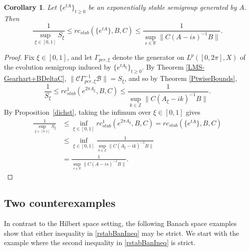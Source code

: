 \documentclass[10pt,psamsfonts,leqno]{siamltex}
\newtheorem{cor}[prop]{Corollary}
\newcommand{\bbR}{\mathbb{R}}
\newcommand{\bbZ}{\mathbb{Z}}
\newcommand{\calB}{\mathcal{B}}
\newcommand{\calC}{\mathcal{C}}
\newcommand{\lb}{\label}
\newcommand{\rcstab}{rc_{stab}}
\newcommand{\Gammaperxi}{\Gamma_{per,\xi}}
\begin{document}
\begin{cor}\lb{rstabBoundsCor}
Let $\{e^{tA}\}_{t\ge0}$ be an exponentially stable semigroup generated
by $A$.  Then
\[
\frac{1}{\sup_{\xi\in[0,1]}S_\xi}\le
\rcstab(\{e^{tA}\},B,C)
\le \frac{1}{\sup_{s\in\bbR}\|C(A-is)^{-1}B\|}.
\]
\end{cor}

\begin{proof}  Fix $\xi\in[0,1]$, and let $\Gammaperxi$ denote
the generator on $L^p([0,2\pi],X)$ of the evolution semigroup  induced
by
$\{e^{tA_\xi}\}_{t\ge0}$.  By Theorem \ref{LMS-Gearhart+BDeltaC},
$\|\calC\Gammaperxi^{-1}\calB\|=S_\xi$,
and so by Theorem \ref{PtwiseBounds},
\[
\frac{1}{S_\xi}\le
\rcstab^1(e^{2\pi A_\xi},B,C)
\le \frac{1}{\sup_{k\in\bbZ}\|C(A_\xi-ik)^{-1}B\|}.
\]
By Proposition~\ref{dichst}, taking the infimum over $\xi\in[0,1]$ gives
\begin{align*}
\frac{1}{\sup_{\xi\in[0,1]}S_\xi}&
\le \inf_{\xi\in[0,1]}\rcstab^1(e^{2\pi A_\xi},B,C)
=\rcstab(\{e^{tA}\},B,C)\\
&\le \inf_{\xi\in[0,1]}\frac{1}{\sup_{k\in\bbZ}\|C(A_\xi-ik)^{-1}B\|}\\
&=\frac{1}{\sup_{s\in\bbR}\|C(A-is)^{-1}B\|}.
\end{align*}
\end{proof}

\subsection{Two counterexamples}\label{counterex}

In contrast to the Hilbert space setting, the following Banach space
examples show that either inequality in \eqref{rstabBanIneq} may be
strict.
We start with the example where the second inequality in
\eqref{rstabBanIneq} is strict.
\end{document}
